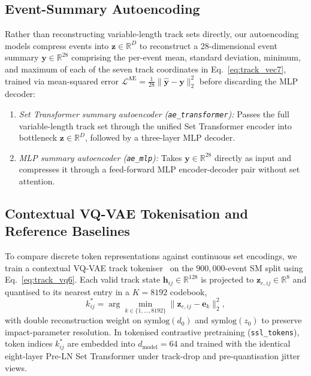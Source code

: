 \documentclass{article}
\begin{document}
\subsection{Event-Summary Autoencoding}

Rather than reconstructing variable-length track sets directly, our autoencoding models compress events into $\mathbf{z} \in \mathbb{R}^D$ to reconstruct a 28-dimensional event summary $\mathbf{y} \in \mathbb{R}^{28}$ comprising the per-event mean, standard deviation, minimum, and maximum of each of the seven track coordinates in Eq.~\eqref{eq:track_vec7}, trained via mean-squared error $\mathcal{L}^{\text{AE}} = \frac{1}{28}\|\hat{\mathbf{y}} - \mathbf{y}\|_2^2$ before discarding the MLP decoder:
\begin{enumerate}
    \item \emph{Set Transformer summary autoencoder (\texttt{ae\_transformer}):} Passes the full variable-length track set through the unified Set Transformer encoder into bottleneck $\mathbf{z} \in \mathbb{R}^D$, followed by a three-layer MLP decoder.
    \item \emph{MLP summary autoencoder (\texttt{ae\_mlp}):} Takes $\mathbf{y} \in \mathbb{R}^{28}$ directly as input and compresses it through a feed-forward MLP encoder-decoder pair without set attention.
\end{enumerate}

\subsection{Contextual VQ-VAE Tokenisation and Reference Baselines}
\label{sec:tokenized_ssl}

To compare discrete token representations against continuous set encodings, we train a contextual VQ-VAE track tokeniser~\cite{VQVAE} on the $900,000$-event SM split using Eq.~\eqref{eq:track_vq6}. Each valid track state $\mathbf{h}_{ij} \in \mathbb{R}^{128}$ is projected to $\mathbf{z}_{e,ij} \in \mathbb{R}^8$ and quantised to its nearest entry in a $K = 8192$ codebook,
\begin{equation}
    k_{ij}^* = \arg\min_{k \in \{1,\dots,8192\}} \|\mathbf{z}_{e,ij} - \mathbf{e}_k\|_2^2 ,
    \label{eq:vqvae}
\end{equation}
with double reconstruction weight on $\text{symlog}(d_0)$ and $\text{symlog}(z_0)$ to preserve impact-parameter resolution. In tokenised contrastive pretraining (\texttt{ssl\_tokens}), token indices $k_{ij}^*$ are embedded into $d_{\text{model}} = 64$ and trained with the identical eight-layer Pre-LN Set Transformer under track-drop and pre-quantisation jitter views.
\end{document}
